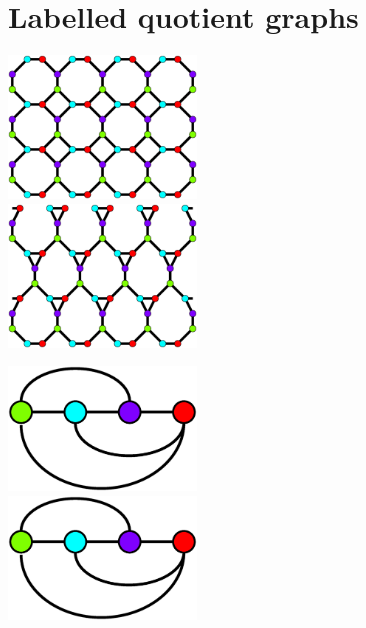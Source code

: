 \documentclass{beamer}
\begin{document}
\section{Labelled quotient graphs}

\begin{frame}
  \begin{minipage}{2in}
     \begin{center}
         \includegraphics[height=1.5in]{periodic1a}\\
         \includegraphics[height=1.5in]{periodic1c}\\
     \end{center}
  \end{minipage}
  \begin{minipage}{1.8in}
     \begin{center}
       \includegraphics[height=1.3in]{periodic1b}\\
       \includegraphics[height=1.3in]{periodic1b}\\
     \end{center}
  \end{minipage}
\end{frame}
\end{document}

